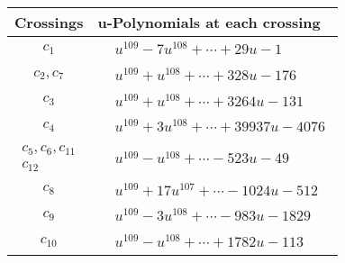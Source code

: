 \documentclass[1p]{elsarticle_modified}
\theoremstyle{definition}
\begin{document}
\begin{tabular}{m{50pt}|m{274pt}}
Crossings & \hspace{64pt}u-Polynomials at each crossing \\
\hline $$\begin{aligned}c_{1}\end{aligned}$$&$\begin{aligned}
&u^{109}-7 u^{108}+\cdots+29 u-1
\end{aligned}$\\
\hline $$\begin{aligned}c_{2},c_{7}\end{aligned}$$&$\begin{aligned}
&u^{109}+u^{108}+\cdots+328 u-176
\end{aligned}$\\
\hline $$\begin{aligned}c_{3}\end{aligned}$$&$\begin{aligned}
&u^{109}+u^{108}+\cdots+3264 u-131
\end{aligned}$\\
\hline $$\begin{aligned}c_{4}\end{aligned}$$&$\begin{aligned}
&u^{109}+3 u^{108}+\cdots+39937 u-4076
\end{aligned}$\\
\hline $$\begin{aligned}c_{5},c_{6},c_{11}\\c_{12}\end{aligned}$$&$\begin{aligned}
&u^{109}- u^{108}+\cdots-523 u-49
\end{aligned}$\\
\hline $$\begin{aligned}c_{8}\end{aligned}$$&$\begin{aligned}
&u^{109}+17 u^{107}+\cdots-1024 u-512
\end{aligned}$\\
\hline $$\begin{aligned}c_{9}\end{aligned}$$&$\begin{aligned}
&u^{109}-3 u^{108}+\cdots-983 u-1829
\end{aligned}$\\
\hline $$\begin{aligned}c_{10}\end{aligned}$$&$\begin{aligned}
&u^{109}- u^{108}+\cdots+1782 u-113
\end{aligned}$\\
\hline
\end{tabular}\\~\\
\end{document}
